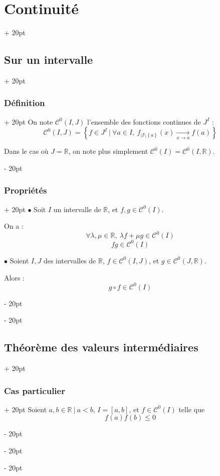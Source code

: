 \documentclass[a4paper, 12pt, twoside]{article}
\newcommand{\R}{\mathbb{R}} %
\newcommand{\tendsto}[1]{\xrightarrow[#1]{}}
\newcommand{\set}[1]{\left\{ #1 \right\}}
\renewcommand{\le}{\leqslant}
\newcommand{\ind}[1][20pt]{\advance\leftskip + #1}
\newcommand{\deind}[1][20pt]{\advance\leftskip - #1}
\newenvironment{indt}[2][20pt]{#2 \par \ind[#1]}{\par \deind} %
\begin{document}
\begin{indt}{\section{Continuité}}
\begin{indt}{\subsection{Sur un intervalle}}
\begin{indt}{\subsubsection{Définition}}
                On note $\mathcal C^0(I, J)$ l'ensemble des fonctions continues de $J^I$ :
                \[
                    \mathcal C^0(I, J) = \set{f \in J^I\ |\ \forall a \in I,\ f_{| I \setminus \set a}(x) \tendsto{x \to a} f(a)}
                \]

                Dans le cas où $J = \R$, on note plus simplement $\mathcal C^0(I) = \mathcal C^0(I, \R)$.
            \end{indt}

            \vspace{12pt}
            
            \begin{indt}{\subsubsection{Propriétés}}
                $\bullet$ Soit $I$ un intervalle de $\R$, et $f, g \in \mathcal C^0(I)$.

                On a :
                \[
                    \forall \lambda, \mu \in \R,\ \lambda f + \mu g \in \mathcal C^0(I)
                \]
                \[
                    fg \in \mathcal C^0(I)
                \]

                \vspace{6pt}
                
                $\bullet$ Soient $I, J$ des intervalles de $\R$, $f \in \mathcal C^0(I, J)$, et $g \in \mathcal C^0(J, \R)$.

                Alors :
                \[
                    g \circ f \in \mathcal C^0(I)
                \]
            \end{indt}
        \end{indt}

        \vspace{12pt}
        
        \begin{indt}{\subsection{Théorème des valeurs intermédiaires}}
            \begin{indt}{\subsubsection{Cas particulier}}
                Soient $a, b \in \R\ |\ a < b$, $I = [a, b]$, et $f \in \mathcal C^0(I)$ telle que
                \[
                    f(a)f(b) \le 0
                \]


\end{indt}
\end{indt}
\end{indt}
\end{document}
